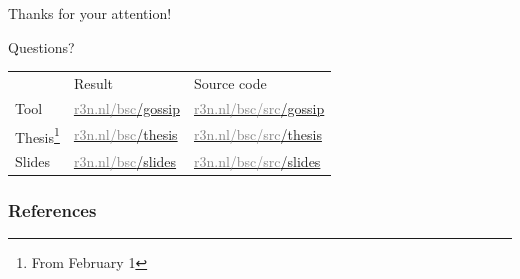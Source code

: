 \documentclass[aspectratio=169]{beamer}
\begin{document}
\begin{frame}[b]
    \begin{center}
        {\Large Thanks for your attention!}
        
        \bigskip
        
        Questions?
        
        \bigskip        
        \bigskip
        
        \small
        \begin{tabular}{lll}
                & Result 
                & Source code \vspace{5pt}\\
            Tool    
                & \href{https://r3n.nl/bsc/gossip}{\textcolor{gray}{r3n.nl/bsc}/gossip}
                & \href{https://r3n.nl/bsc/src/gossip}{\textcolor{gray}{r3n.nl/bsc/src}/gossip} \vspace{5pt}\\
            Thesis\footnote{From February 1}  
                & \href{https://r3n.nl/bsc/thesis}{\textcolor{gray}{r3n.nl/bsc}/thesis} 
                & \href{https://r3n.nl/bsc/src/thesis}{\textcolor{gray}{r3n.nl/bsc/src}/thesis} \vspace{5pt}\\
            Slides  
                & \href{https://r3n.nl/bsc/slides}{\textcolor{gray}{r3n.nl/bsc}/slides} 
                & \href{https://r3n.nl/bsc/src/slides}{\textcolor{gray}{r3n.nl/bsc/src}/slides} \\
        \end{tabular}
        
        \bigskip
    \end{center}
\end{frame}
\begin{frame}[t,allowframebreaks]
    \frametitle{References}
    \printbibliography
\end{frame}
\end{document}
